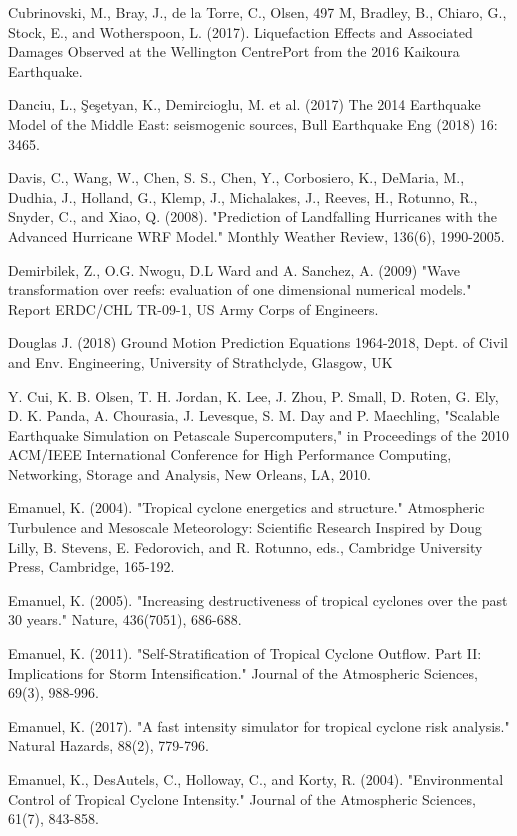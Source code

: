 Cubrinovski, M., Bray, J., de la Torre, C., Olsen, 497 M, Bradley, B., Chiaro, G., Stock, E., and Wotherspoon, L. (2017). Liquefaction Effects and Associated Damages Observed at the Wellington CentrePort from the 2016 Kaikoura Earthquake.

Danciu, L., Şeşetyan, K., Demircioglu, M. et al. (2017) The 2014 Earthquake Model of the Middle East: seismogenic sources, Bull Earthquake Eng (2018) 16: 3465. 

Davis, C., Wang, W., Chen, S. S., Chen, Y., Corbosiero, K., DeMaria, M., Dudhia, J., Holland, G., Klemp, J., Michalakes, J., Reeves, H., Rotunno, R., Snyder, C., and Xiao, Q. (2008). "Prediction of Landfalling Hurricanes with the Advanced Hurricane WRF Model." Monthly Weather Review, 136(6), 1990-2005.

Demirbilek, Z., O.G. Nwogu, D.L Ward and A. Sanchez, A. (2009) "Wave transformation over reefs: evaluation of one dimensional numerical models." Report ERDC/CHL TR-09-1, US Army Corps of Engineers.

Douglas J. (2018) Ground Motion Prediction Equations 1964-2018, Dept. of Civil and Env. Engineering, University of Strathclyde, Glasgow, UK

Y. Cui, K. B. Olsen, T. H. Jordan, K. Lee, J. Zhou, P. Small, D. Roten, G. Ely, D. K. Panda, A. Chourasia, J. Levesque, S. M. Day and P. Maechling, "Scalable Earthquake Simulation on Petascale Supercomputers," in Proceedings of the 2010 ACM/IEEE International Conference for High Performance Computing, Networking, Storage and Analysis, New Orleans, LA, 2010.

Emanuel, K. (2004). "Tropical cyclone energetics and structure." Atmospheric Turbulence and Mesoscale Meteorology: Scientific Research Inspired by Doug Lilly, B. Stevens, E. Fedorovich, and R. Rotunno, eds., Cambridge University Press, Cambridge, 165-192.

Emanuel, K. (2005). "Increasing destructiveness of tropical cyclones over the past 30 years." Nature, 436(7051), 686-688.

Emanuel, K. (2011). "Self-Stratification of Tropical Cyclone Outflow. Part II: Implications for Storm Intensification." Journal of the Atmospheric Sciences, 69(3), 988-996.

Emanuel, K. (2017). "A fast intensity simulator for tropical cyclone risk analysis." Natural Hazards, 88(2), 779-796.

Emanuel, K., DesAutels, C., Holloway, C., and Korty, R. (2004). "Environmental Control of Tropical Cyclone Intensity." Journal of the Atmospheric Sciences, 61(7), 843-858.


